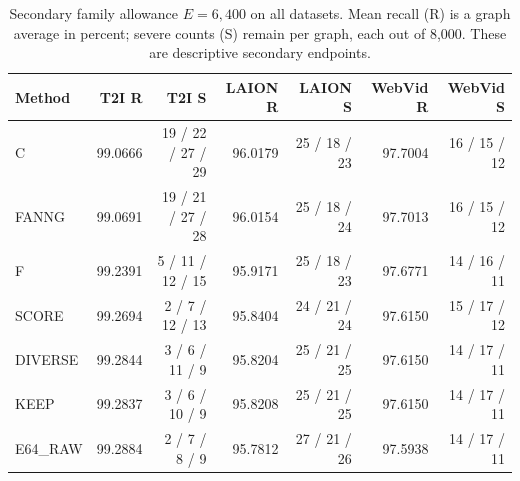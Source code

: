 \begin{table}[t]
\centering
\caption{Secondary family allowance $E=6{,}400$ on all datasets. Mean recall (R) is a graph average in percent; severe counts (S) remain per graph, each out of 8,000. These are descriptive secondary endpoints.}
\label{tab:secondary}
\small
\begin{tabular}{@{}lrrrrrr@{}}
\toprule
Method & T2I R & T2I S & LAION R & LAION S & WebVid R & WebVid S \\
\midrule
C & 99.0666 & 19 / 22 / 27 / 29 & 96.0179 & 25 / 18 / 23 & 97.7004 & 16 / 15 / 12 \\
FANNG & 99.0691 & 19 / 21 / 27 / 28 & 96.0154 & 25 / 18 / 24 & 97.7013 & 16 / 15 / 12 \\
F & 99.2391 & 5 / 11 / 12 / 15 & 95.9171 & 25 / 18 / 23 & 97.6771 & 14 / 16 / 11 \\
SCORE & 99.2694 & 2 / 7 / 12 / 13 & 95.8404 & 24 / 21 / 24 & 97.6150 & 15 / 17 / 12 \\
DIVERSE & 99.2844 & 3 / 6 / 11 / 9 & 95.8204 & 25 / 21 / 25 & 97.6150 & 14 / 17 / 11 \\
KEEP & 99.2837 & 3 / 6 / 10 / 9 & 95.8208 & 25 / 21 / 25 & 97.6150 & 14 / 17 / 11 \\
E64\_RAW & 99.2884 & 2 / 7 / 8 / 9 & 95.7812 & 27 / 21 / 26 & 97.5938 & 14 / 17 / 11 \\
\bottomrule
\end{tabular}
\end{table}
